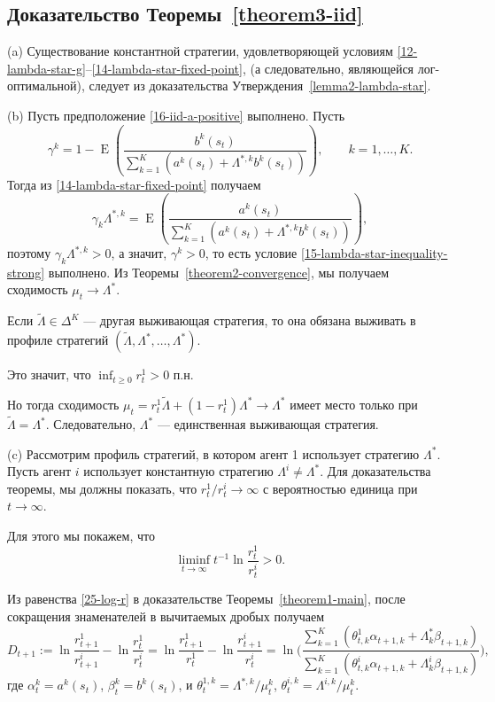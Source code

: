 \documentclass[a4paper,12pt,russian]{article} %
\theoremstyle{definition}
\DeclareMathOperator{\E}{E}
\renewcommand{\tilde}{\widetilde}
\begin{document}
\subsection{Доказательство Теоремы~\ref{theorem3-iid}}
(a) Существование константной стратегии, удовлетворяющей условиям \eqref{12-lambda-star-g}--\eqref{14-lambda-star-fixed-point}, (а следовательно, являющейся лог-оптимальной), следует из доказательства Утверждения~\ref{lemma2-lambda-star}.

(b) Пусть предположение \eqref{16-iid-a-positive} выполнено.
Пусть
\begin{equation}
\label{gt-iid}
\gamma^k 
= 1 - \E\left( \frac{b^k(s_t)}{\sum_{k=1}^K (a^k(s_t) + \Lambda^{*,k} b^k(s_t))}\right),
  \qquad k=1,\dots,K.
\end{equation}
Тогда из \eqref{14-lambda-star-fixed-point} получаем
\begin{equation}
\label{gt-lambda-iid}
\gamma_k \Lambda^{*,k} 
= \E \left(
  \frac{a^k(s_t)}
       {\sum_{k=1}^K(a^k(s_t) + \Lambda^{*,k} b^k(s_t))}
  \right),
\end{equation}
поэтому $\gamma_k\Lambda^{*,k}>0$, а значит, $\gamma^k>0$, то есть условие \eqref{15-lambda-star-inequality-strong} выполнено.
Из Теоремы~\ref{theorem2-convergence}, мы получаем сходимость $\mu_t\to\Lambda^*$.

Если $\tilde\Lambda\in \Delta^K$ — другая выживающая стратегия, то она обязана выживать в профиле стратегий $(\tilde\Lambda, \Lambda^*,\dots,\Lambda^*)$.

Это значит, что $\inf_{t\ge 0} r_t^1 > 0$ п.н.

Но тогда сходимость $\mu_t = r_t^1\tilde\Lambda + (1-r_t^1)\Lambda^* \to \Lambda^*$ имеет место только при $\tilde\Lambda = \Lambda^*$.
Следовательно, $\Lambda^*$ — единственная выживающая стратегия.

(c) Рассмотрим профиль стратегий, в котором агент 1 использует стратегию $\Lambda^*$.
Пусть агент $i$ использует константную стратегию $\Lambda^i\neq\Lambda^*$.
Для доказательства теоремы, мы должны показать, что $r_t^1/r_t^i \to \infty$ с вероятностью единица при $t\to\infty$.

Для этого мы покажем, что 
\begin{equation}
\label{36-liminf}
\liminf_{t\to\infty} t^{-1} \ln \frac{r_t^1}{r_t^i} > 0.
\end{equation}

Из равенства \eqref{25-log-r} в доказательстве Теоремы~\ref{theorem1-main}, после сокращения знаменателей в вычитаемых дробых получаем
\[
D_{t+1} := \ln\frac{r_{t+1}^1}{r_{t+1}^i} - \ln\frac{r_t^1}{r_t^i}= 
\ln\frac{r_{t+1}^1}{r_{t}^1} - \ln\frac{r_{t+1}^i}{r_t^i}
= \ln\Biggl(
  \frac{\sum_{k=1}^K(\theta^1_{t,k} \alpha_{t+1,k} + \Lambda^*_k\beta_{t+1,k})}
       {\sum_{k=1}^K(\theta^i_{t,k} \alpha_{t+1,k} + \Lambda^i_k\beta_{t+1,k})}
  \Biggr),
\]
где $\alpha_{t}^k = a^k(s_t)$, $\beta_{t}^k = b^k(s_t)$, и $\theta_{t}^{1,k} = \Lambda^{*,k}/\mu_{t}^k$, $\theta_{t}^{i,k} = \Lambda^{i,k}/\mu_{t}^k$. 
\end{document}

